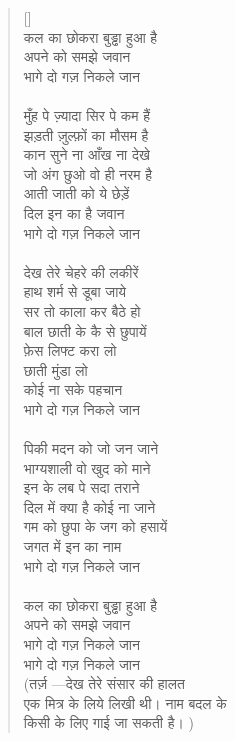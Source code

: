 \begin{verse}[\versewidth]
{\\
कल का छोकरा बुड्ढा हुआ है\\
अपने को समझे जवान\\
भागे दो गज़ निकले जान\\
\\
मुँह पे ज़्यादा सिर पे कम हैं\\
झड़ती ज़ुल्फ़ों का मौसम है\\
कान सुने ना आँख ना देखे\\
जो अंग छुओ वो ही नरम है\\
आती जाती को ये छेड़ें\\
दिल इन का है जवान\\
भागे दो गज़ निकले जान\\
\\
देख तेरे चेहरे की लकीरें\\
हाथ शर्म से डूबा जाये\\
सर तो काला कर बैठे हो\\
बाल छाती के कै से छुपायें\\
फ़ेस लिफ्ट करा लो\\
छाती मुंडा लो\\
कोई ना सके पहचान\\
भागे दो गज़ निकले जान\\
\\
पिकी मदन को जो जन जाने\\
भाग्यशाली वो खुद को माने\\
इन के लब पे सदा तराने\\
दिल में क्या है कोई ना जाने\\
गम को छुपा के जग को हसायें\\
जगत में इन का नाम \\
भागे दो गज़ निकले जान\\
\\
कल का छोकरा बुड्ढा हुआ है\\
अपने को समझे जवान\\
भागे दो गज़ निकले जान\\
भागे दो गज़ निकले जान\\
(तर्ज़ —देख तेरे संसार की हालत\\
एक मित्र के लिये लिखी थी। नाम बदल के\\
किसी के लिए गाई जा सकती है।
)
}\end{verse}
